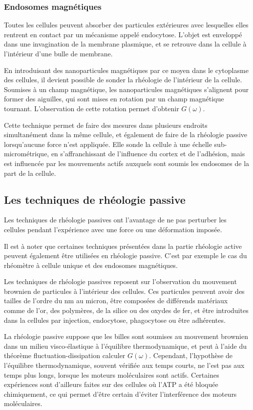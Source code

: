 \subsubsection{Endosomes magnétiques}

Toutes les cellules peuvent absorber des particules extérieures avec lesquelles elles rentrent en contact par un mécanisme appelé endocytose. L'objet est enveloppé dans une invagination de la membrane plasmique, et se retrouve dans la cellule à l'intérieur d'une bulle de membrane. 

En introduisant des nanoparticules magnétiques par ce moyen dans le cytoplasme des cellules, il devient possible de sonder la rhéologie de l'intérieur de la cellule. 
Soumises à un champ magnétique, les nanoparticules magnétiques s'alignent pour former des aiguilles, qui sont mises en rotation par un champ magnétique tournant. 
L'observation de cette rotation permet d'obtenir $G(\omega)$. 

Cette technique permet de faire des mesures dans plusieurs endroits  simultanément dans la même cellule, et également de faire de la rhéologie passive lorsqu'aucune force n'est appliquée. Elle sonde la cellule à une échelle sub-micrométrique, en s'affranchissant de l'influence du cortex et de l'adhésion, mais est influencée par les mouvements actifs auxquels sont soumis les endosomes de la part de la cellule. 

\subsection{Les techniques de rhéologie passive}
Les techniques de rhéologie passives ont l'avantage de ne pas perturber les cellules pendant l'expérience avec une force ou une déformation imposée. 

Il est à noter que certaines techniques présentées dans la partie rhéologie active peuvent également être utilisées en rhéologie passive. C'est par exemple le cas du rhéomètre à cellule unique et des endosomes magnétiques. 

Les techniques de rhéologie passives reposent sur l'observation du mouvement brownien de particules à l'intérieur des cellules. Ces particules peuvent avoir des tailles de l'ordre du nm au micron, être composées de différends matériaux comme de l'or, des polymères, de la silice ou des oxydes de fer, et être introduites dans la cellules par injection, endocytose, phagocytose ou être adhérentes. 

La rhéologie passive suppose que les billes sont soumises au mouvement brownien dans un milieu visco-élastique à l'équilibre thermodynamique, et peut à l'aide du théorème fluctuation-dissipation calculer $G(\omega)$. 
Cependant, l'hypothèse de l'équilibre thermodynamique, souvent vérifiée aux temps courts, ne l'est pas aux temps plus longs, lorsque les moteurs moléculaires sont actifs. 
Certaines expériences sont d'ailleurs faites sur des cellules où l'ATP a été bloquée chimiquement, ce qui permet d'être certain d'éviter l'interférence des moteurs moléculaires. 

